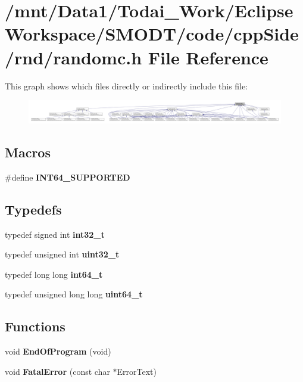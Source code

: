 \section{/mnt/\-Data1/\-Todai\-\_\-\-Work/\-Eclipse\-Workspace/\-S\-M\-O\-D\-T/code/cpp\-Side/rnd/randomc.h File Reference}
\label{rnd_2randomc_8h}
This graph shows which files directly or indirectly include this file\-:
\nopagebreak
\begin{figure}[H]
\begin{center}
\leavevmode
\includegraphics[width=350pt]{rnd_2randomc_8h__dep__incl}
\end{center}
\end{figure}
\subsection*{Macros}
\begin{DoxyCompactItemize}
\item 
\#define {\bf I\-N\-T64\-\_\-\-S\-U\-P\-P\-O\-R\-T\-E\-D}
\end{DoxyCompactItemize}
\subsection*{Typedefs}
\begin{DoxyCompactItemize}
\item 
typedef signed int {\bf int32\-\_\-t}
\item 
typedef unsigned int {\bf uint32\-\_\-t}
\item 
typedef long long {\bf int64\-\_\-t}
\item 
typedef unsigned long long {\bf uint64\-\_\-t}
\end{DoxyCompactItemize}
\subsection*{Functions}
\begin{DoxyCompactItemize}
\item 
void {\bf End\-Of\-Program} (void)
\item 
void {\bf Fatal\-Error} (const char $\ast$Error\-Text)
\end{DoxyCompactItemize}


